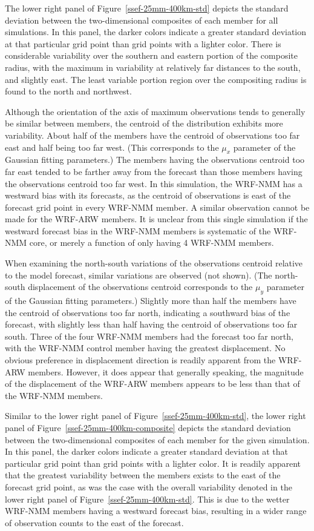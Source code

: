 The lower right panel of \mbox{Figure \ref{ssef-25mm-400km-std}} depicts the standard deviation between the two-dimensional composites of each member for all simulations.
In this panel, the darker colors indicate a greater standard deviation at that particular grid point than grid points with a lighter color.
There is considerable variability over the southern and eastern portion of the composite radius, with the maximum in variability at relatively far distances to the south, and slightly east.
The least variable portion region over the compositing radius is found to the north and northwest.


Although the orientation of the axis of maximum observations tends to generally be similar between members, the centroid of the distribution exhibits more variability.
About half of the members have the centroid of observations too far east and half being too far west.
(This corresponds to the $\mu_x$ parameter of the Gaussian fitting parameters.)
The members having the observations centroid too far east tended to be farther away from the forecast than those members having the observations centroid too far west.
In this simulation, the WRF-NMM has a westward bias with its forecasts, as the centroid of observations is east of the forecast grid point in every WRF-NMM member.
A similar observation cannot be made for the WRF-ARW members.
It is unclear from this single simulation if the westward forecast bias in the WRF-NMM members is systematic of the WRF-NMM core, or merely a function of only having 4 WRF-NMM members.


When examining the north-south variations of the observations centroid relative to the model forecast, similar variations are observed (not shown).
(The north-south displacement of the observations centroid corresponds to the $\mu_y$ parameter of the Gaussian fitting parameters.)
Slightly more than half the members have the centroid of observations too far north, indicating a southward bias of the forecast, with slightly less than half having the centroid of observations too far south.
Three of the four WRF-NMM members had the forecast too far north, with the WRF-NMM control member having the greatest displacement.
No obvious preference in displacement direction is readily apparent from the WRF-ARW members.
However, it does appear that generally speaking, the magnitude of the displacement of the WRF-ARW members appears to be less than that of the WRF-NMM members.


Similar to the lower right panel of \mbox{Figure \ref{ssef-25mm-400km-std}}, the lower right panel of \mbox{Figure \ref{ssef-25mm-400km-composite}} depicts the standard deviation between the two-dimensional composites of each member for the given simulation.
In this panel, the darker colors indicate a greater standard deviation at that particular grid point than grid points with a lighter color.
It is readily apparent that the greatest variability between the members exists to the east of the forecast grid point, as was the case with the overall variability denoted in the lower right panel of \mbox{Figure \ref{ssef-25mm-400km-std}}.
This is due to the wetter WRF-NMM members having a westward forecast bias, resulting in a wider range of observation counts to the east of the forecast.


